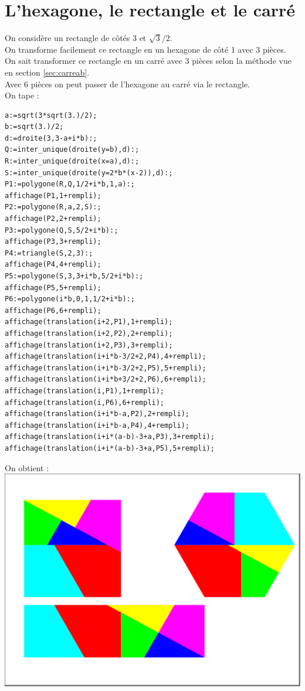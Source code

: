\documentclass[a4paper,11pt]{book}
\begin{document}
\section{L'hexagone, le rectangle et le carr\'e}
On consid\`ere un rectangle de c\^ot\'es 3 et $\sqrt 3/2$.\\
On transforme facilement ce rectangle en un hexagone de c\^ot\'e 1 avec 3 
pi\`eces.\\
On sait transformer ce rectangle en un carr\'e avec 3 pi\`eces selon la 
m\'ethode vue en section \ref{sec:carreab}.\\  
Avec 6 pi\`eces on peut passer de l'hexagone au carr\'e via le rectangle.\\
On tape :
\begin{verbatim}
a:=sqrt(3*sqrt(3.)/2);
b:=sqrt(3.)/2;
d:=droite(3,3-a+i*b):;
Q:=inter_unique(droite(y=b),d):;
R:=inter_unique(droite(x=a),d):;
S:=inter_unique(droite(y=2*b*(x-2)),d):;
P1:=polygone(R,Q,1/2+i*b,1,a):;
affichage(P1,1+rempli);
P2:=polygone(R,a,2,S):;
affichage(P2,2+rempli);
P3:=polygone(Q,S,5/2+i*b):;
affichage(P3,3+rempli);
P4:=triangle(S,2,3):;
affichage(P4,4+rempli);
P5:=polygone(S,3,3+i*b,5/2+i*b):;
affichage(P5,5+rempli);
P6:=polygone(i*b,0,1,1/2+i*b):;
affichage(P6,6+rempli);
affichage(translation(i+2,P1),1+rempli);
affichage(translation(i+2,P2),2+rempli);
affichage(translation(i+2,P3),3+rempli);
affichage(translation(i+i*b-3/2+2,P4),4+rempli);
affichage(translation(i+i*b-3/2+2,P5),5+rempli);
affichage(translation(i+i*b+3/2+2,P6),6+rempli);
affichage(translation(i,P1),1+rempli);
affichage(translation(i,P6),6+rempli);
affichage(translation(i+i*b-a,P2),2+rempli);
affichage(translation(i+i*b-a,P4),4+rempli);
affichage(translation(i+i*(a-b)-3+a,P3),3+rempli);
affichage(translation(i+i*(a-b)-3+a,P5),5+rempli);
\end{verbatim}
On obtient :\\
\includegraphics[width=\textwidth]{carrehexa}
\end{document}

